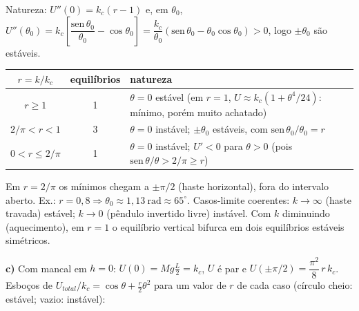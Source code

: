 \documentclass{article}%
\begin{document}
Natureza: $U''(0)=k_c(r-1)$ e, em $\theta_0$,
$U''(\theta_0)=k_c\left[\dfrac{\mathrm{sen}\,\theta_0}{\theta_0}-\cos\theta_0\right]=\dfrac{k_c}{\theta_0}\left(\mathrm{sen}\,\theta_0-\theta_0\cos\theta_0\right)>0$, logo $\pm\theta_0$ são estáveis.

\begin{center}
\begin{tabular}{c|c|l}
$r=k/k_c$ & equilíbrios & natureza\\\hline
$r\ge1$ & 1 & $\theta=0$ estável (em $r=1$, $U\approx k_c(1+\theta^4/24)$: mínimo, porém muito achatado)\\
$2/\pi<r<1$ & 3 & $\theta=0$ instável; $\pm\theta_0$ estáveis, com $\mathrm{sen}\,\theta_0/\theta_0=r$\\
$0<r\le2/\pi$ & 1 & $\theta=0$ instável; $U'<0$ para $\theta>0$ (pois $\mathrm{sen}\,\theta/\theta>2/\pi\ge r$)\\
\end{tabular}
\end{center}
Em $r=2/\pi$ os mínimos chegam a $\pm\pi/2$ (haste horizontal), fora do intervalo aberto. Ex.: $r=0{,}8\Rightarrow\theta_0\approx1{,}13\ \mathrm{rad}\approx65^\circ$. Casos-limite coerentes: $k\to\infty$ (haste travada) estável; $k\to0$ (pêndulo invertido livre) instável. Com $k$ diminuindo (aquecimento), em $r=1$ o equilíbrio vertical bifurca em dois equilíbrios estáveis simétricos.

\textbf{c)} Com mancal em $h=0$: $U(0)=Mg\frac L2=k_c$, $U$ é par e $U(\pm\pi/2)=\dfrac{\pi^2}{8}\,r\,k_c$. Esboços de $U_{total}/k_c=\cos\theta+\frac r2\theta^2$ para um valor de $r$ de cada caso (círculo cheio: estável; vazio: instável):
\end{document}
